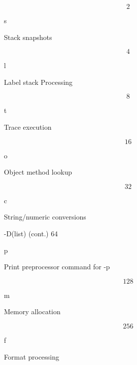 \documentclass[a4paper,11pt]{book}
\begin{document}
\noindent 

\[2\] 


\noindent s

\noindent 

\noindent Stack snapshots

\noindent 

\noindent 

\[4\] 


\noindent l

\noindent 

\noindent Label stack Processing

\noindent 

\noindent 

\[8\] 


\noindent t

\noindent 

\noindent Trace execution

\noindent 

\noindent 

\[16\] 


\noindent o

\noindent 

\noindent Object method lookup

\noindent 

\noindent 

\[32\] 


\noindent c

\noindent 

\noindent String/numeric conversions

\noindent 

\noindent -D(list) (cont.) 64

\noindent p

\noindent 

\noindent Print preprocessor command for -p

\noindent 

\noindent 

\[128\] 


\noindent m

\noindent 

\noindent Memory allocation

\noindent 

\noindent 

\[256\] 


\noindent f

\noindent 

\noindent Format processing

\noindent 
\end{document}
